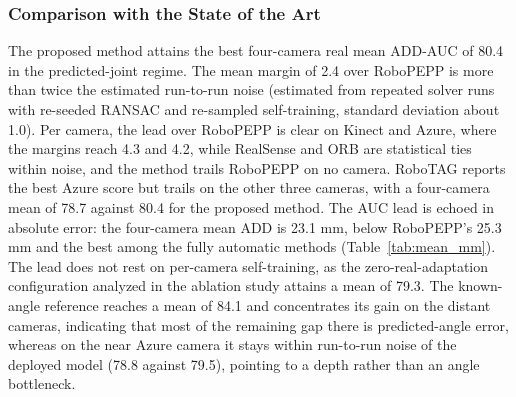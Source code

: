 \subsubsection{Comparison with the State of the Art}
The proposed method attains the best four-camera real mean ADD-AUC of 80.4 in the predicted-joint regime. The mean margin of 2.4 over RoboPEPP is more than twice the estimated run-to-run noise (estimated from repeated solver runs with re-seeded RANSAC and re-sampled self-training, standard deviation about 1.0). Per camera, the lead over RoboPEPP is clear on Kinect and Azure, where the margins reach 4.3 and 4.2, while RealSense and ORB are statistical ties within noise, and the method trails RoboPEPP on no camera. RoboTAG reports the best Azure score but trails on the other three cameras, with a four-camera mean of 78.7 against 80.4 for the proposed method. The AUC lead is echoed in absolute error: the four-camera mean ADD is 23.1 mm, below RoboPEPP's 25.3 mm and the best among the fully automatic methods (Table~\ref{tab:mean_mm}). The lead does not rest on per-camera self-training, as the zero-real-adaptation configuration analyzed in the ablation study attains a mean of 79.3. The known-angle reference reaches a mean of 84.1 and concentrates its gain on the distant cameras, indicating that most of the remaining gap there is predicted-angle error, whereas on the near Azure camera it stays within run-to-run noise of the deployed model (78.8 against 79.5), pointing to a depth rather than an angle bottleneck.

